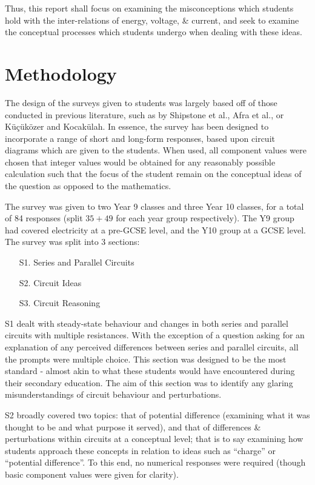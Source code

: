 \documentclass[a4paper,openany,nobib]{tufte-book}
\begin{document}
Thus, this report shall focus on examining the misconceptions which students hold with the inter-relations of energy, voltage, \& current, and seek to examine the conceptual processes which students undergo when dealing with these ideas.
\newpage
\chapter{Methodology}%
The design of the surveys given to students was largely based off of those conducted in previous literature, such as by Shipstone et al., Afra et al., or Küçüközer and Kocakülah\autocite{shipstone_europe,afra2009,kucu2007}. In essence, the survey has been designed to incorporate a range of short and long-form responses, based upon circuit diagrams which are given to the students. When used, all component values were chosen that integer values would be obtained for any reasonably possible calculation such that the focus of the student remain on the conceptual ideas of the question as opposed to the mathematics.

The survey was given to two Year 9 classes and three Year 10 classes, for a total of 84 responses (split $35+49$ for each year group respectively). The Y9 group had covered electricity at a pre-GCSE level, and the Y10 group at a GCSE level. The survey was split into 3 sections:
\begin{itemize}
	\item[S1.] Series and Parallel Circuits
	\item[S2.] Circuit Ideas
	\item[S3.] Circuit Reasoning
\end{itemize}
S1 dealt with steady-state behaviour and changes in both series and parallel circuits with multiple resistances. With the exception of a question asking for an explanation of any perceived differences between series and parallel circuits, all the prompts were multiple choice. This section was designed to be the most standard - almost akin to what these students would have encountered during their secondary education. The aim of this section was to identify any glaring misunderstandings of circuit behaviour and perturbations.

S2 broadly covered two topics:
that of potential difference (examining what it was thought to be and what purpose it served), and that of differences \& perturbations within circuits at a conceptual level; that is to say examining how students approach these concepts in relation to ideas such as ``charge'' or ``potential difference''. 
To this end, no numerical responses were required (though basic component values were given for clarity).
\end{document}
